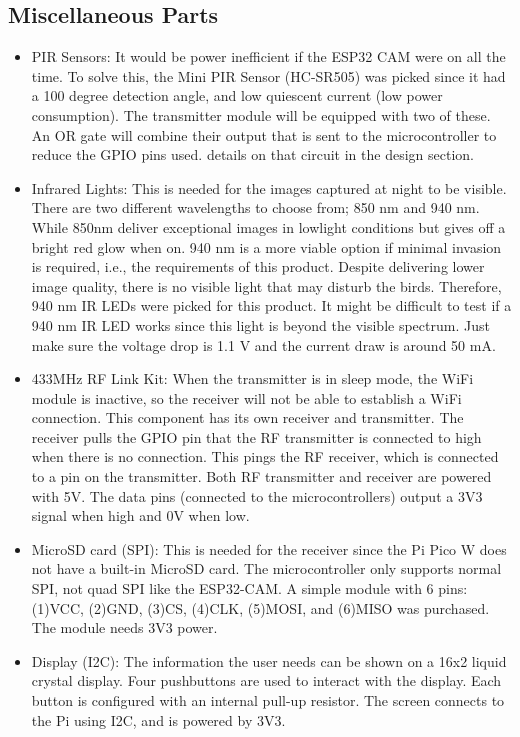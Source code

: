 \subsection{Miscellaneous Parts}
\begin{itemize}
    \item PIR Sensors: It would be power inefficient if the ESP32 CAM were on all the time. To solve this, the Mini PIR Sensor (HC-SR505) was picked since it had a 100 degree detection angle, and low quiescent current (low power consumption). The transmitter module will be equipped with two of these. An OR gate will combine their output that is sent to the microcontroller to reduce the GPIO pins used. details on that circuit in the design section. 
    \item Infrared Lights: This is needed for the images captured at night to be visible. There are two different wavelengths to choose from; 850 nm and 940 nm. While 850nm deliver exceptional images in lowlight conditions but gives off a bright red glow when on. 940 nm is a more viable option if minimal invasion is required, i.e., the requirements of this product. Despite delivering lower image quality, there is no visible light that may disturb the birds. Therefore, 940 nm IR LEDs were picked for this product. It might be difficult to test if a 940 nm IR LED works since this light is beyond the visible spectrum. Just make sure the voltage drop is 1.1 V and the current draw is around 50 mA. 
    \item 433MHz RF Link Kit: When the transmitter is in sleep mode, the WiFi module is inactive, so the receiver will not be able to establish a WiFi connection. This component has its own receiver and transmitter. The receiver pulls the GPIO pin that the RF transmitter is connected to high when there is no connection. This pings the RF receiver, which is connected to a pin on the transmitter. Both RF transmitter and receiver are powered with 5V. The data pins (connected to the microcontrollers) output a 3V3 signal when high and 0V when low. 
    \item MicroSD card (SPI): This is needed for the receiver since the Pi Pico W does not have a built-in MicroSD card. The microcontroller only supports normal SPI, not quad SPI like the ESP32-CAM. A simple module with 6 pins: (1)VCC, (2)GND, (3)CS, (4)CLK, (5)MOSI, and (6)MISO was purchased. The module needs 3V3 power. 
    \item Display (I2C): The information the user needs can be shown on a 16x2 liquid crystal display. Four pushbuttons are used to interact with the display. Each button is configured with an internal pull-up resistor. The screen connects to the Pi using I2C, and is powered by 3V3. 
\end{itemize}

